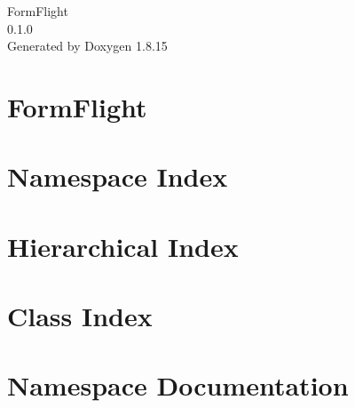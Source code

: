 \let\mypdfximage\pdfximage\def\pdfximage{\immediate\mypdfximage}\documentclass[twoside]{book}
\newcommand{\+}{\discretionary{\mbox{\scriptsize$\hookleftarrow$}}{}{}}
\newcommand{\clearemptydoublepage}{%
  \newpage{\pagestyle{empty}\cleardoublepage}%
}
\begin{document}
\hypersetup{pageanchor=false,
             bookmarksnumbered=true,
             pdfencoding=unicode
            }
\begin{titlepage}
\vspace*{7cm}
\begin{center}%
{\Large Form\+Flight \\[1ex]\large 0.\+1.\+0 }\\
\vspace*{1cm}
{\large Generated by Doxygen 1.8.15}\\
\end{center}
\end{titlepage}
\clearemptydoublepage
{}
\tableofcontents
\clearemptydoublepage
{}
\hypersetup{pageanchor=true}

\chapter{Form\+Flight}
\label{index}\hypertarget{index}{}
\chapter{Namespace Index}

\chapter{Hierarchical Index}

\chapter{Class Index}

\chapter{Namespace Documentation}












\end{document}
